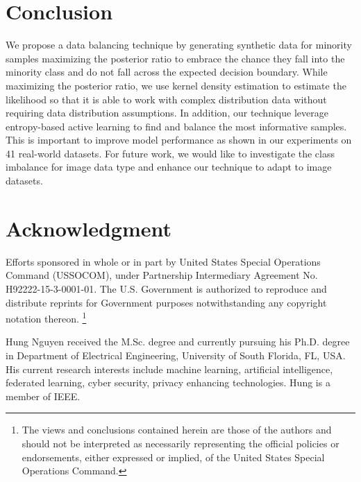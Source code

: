 \documentclass[journal]{IEEEtai}
\begin{document}
\section {Conclusion}
\label{sec:conclusion}
We propose a data balancing technique by generating synthetic data for minority samples maximizing the posterior ratio to embrace the chance they fall into the minority class and do not fall across the expected decision boundary. While maximizing the posterior ratio, we use kernel density estimation to estimate the likelihood so that it is able to work with complex distribution data without requiring data distribution assumptions. In addition, our technique leverage entropy-based active learning to find and balance the most informative samples. This is important to improve model performance as shown in our experiments on 41 real-world datasets. For future work, we would like to investigate the class imbalance for image data type and enhance our technique to adapt to image datasets.     

\section*{Acknowledgment}

Efforts sponsored in whole or in part by United States Special Operations Command (USSOCOM), under Partnership Intermediary Agreement No. H92222-15-3-0001-01. The U.S. Government is authorized to reproduce and distribute reprints for Government purposes notwithstanding any copyright notation thereon.  
{\footnote{ The views and conclusions contained herein are those of the authors and should not be interpreted as necessarily representing the official policies or endorsements, either expressed or implied, of the United States Special Operations Command.} }

\balance





\iffalse
\begin{IEEEbiography}{Hung Nguyen}
	received the M.Sc. degree and currently pursuing his Ph.D. degree in Department of Electrical Engineering, University of South Florida, FL, USA. His current research interests include machine learning, artificial intelligence, federated learning, cyber security, privacy enhancing technologies. Hung is a member of IEEE.
\end{IEEEbiography}
\end{document}
